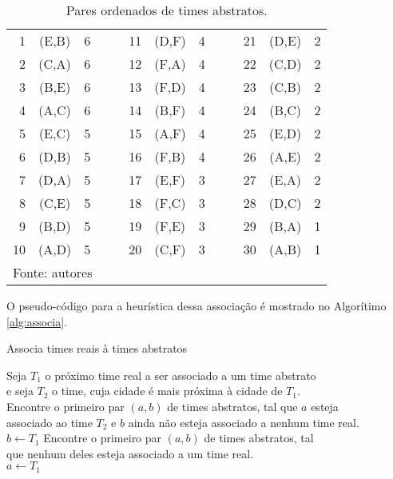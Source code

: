 \documentclass[12pt,a4paper]{article}
\makeatletter
\renewcommand*{\arraystretch}{1.2}
\newcommand{\algorithmfootnote}[2][\footnotesize]{%
	\let\old@algocf@finish\@algocf@finish%
	\def\@algocf@finish{\old@algocf@finish%
		\leavevmode\rlap{\begin{minipage}{\linewidth}
				#1#2
		\end{minipage}}%
	}%
}
\numberwithin{figure}{section}
\numberwithin{table}{section}
\makeatother
\begin{document}
\begin{table}[H]
	\renewcommand{\arraystretch}{1}
	\centering
	\caption{Pares ordenados de times abstratos.}
	\label{tab:abstratos}
	\begin{tabular}{rcc c|c rcc c|c rcc}
		\toprule
		 1 & (E,B) & 6 &&& 11 & (D,F) & 4 &&& 21 & (D,E) & 2 \\
		 2 & (C,A) & 6 &&& 12 & (F,A) & 4 &&& 22 & (C,D) & 2 \\
		 3 & (B,E) & 6 &&& 13 & (F,D) & 4 &&& 23 & (C,B) & 2 \\
		 4 & (A,C) & 6 &&& 14 & (B,F) & 4 &&& 24 & (B,C) & 2 \\
		 5 & (E,C) & 5 &&& 15 & (A,F) & 4 &&& 25 & (E,D) & 2 \\
		 6 & (D,B) & 5 &&& 16 & (F,B) & 4 &&& 26 & (A,E) & 2 \\
		 7 & (D,A) & 5 &&& 17 & (E,F) & 3 &&& 27 & (E,A) & 2 \\
		 8 & (C,E) & 5 &&& 18 & (F,C) & 3 &&& 28 & (D,C) & 2 \\
		 9 & (B,D) & 5 &&& 19 & (F,E) & 3 &&& 29 & (B,A) & 1 \\
		10 & (A,D) & 5 &&& 20 & (C,F) & 3 &&& 30 & (A,B) & 1 \\
		\bottomrule
		\multicolumn{13}{l}{\footnotesize Fonte: autores}
	\end{tabular}
\end{table}

O pseudo-código para a heurística dessa associação é mostrado no Algorítimo \ref{alg:associa}.

\vspace{0.5cm}
\begin{algorithm}[H]
	\caption{Associa times reais à times abstratos}
	\algorithmfootnote{Fonte: \citet*{marcio:jogos}}
	\label{alg:associa}
	 {
		Seja $T_{1}$ o próximo time real a ser associado a um time abstrato\\
		e seja $T_{2}$ o time, cuja cidade é mais próxima à cidade de $T_{1}$.\\
		 {
			Encontre o primeiro par $(a,b)$ de times abstratos, tal que $a$ esteja\\
			associado ao time $T_{2}$ e $b$ ainda não esteja associado a nenhum time real.\\
			$b \leftarrow T_{1}$ }
		{ Encontre o primeiro par $(a,b)$ de times abstratos, tal\\
			que nenhum deles esteja associado a um time real.\\
			$a \leftarrow T_{1}$ } }
\end{algorithm}
\vspace{0.5cm}
\end{document}
